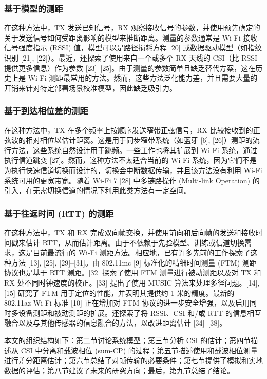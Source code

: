\documentclass[journal]{IEEEtran}
\begin{document}
\subsubsection{基于模型的测距}
在这种方法中，TX 发送已知信号，RX 观察接收信号的参数，并使用预先确定的关于发送信号如何受距离影响的模型来推断距离。测量的参数通常是 Wi-Fi 接收信号强度指示 (RSSI) 值，模型可以是路径损耗方程 [20] 或数据驱动模型（如指纹识别 [21], [22]）。最近，还探索了使用来自一个或多个 RX 天线的 CSI（比 RSSI 提供更多信息）作为参数 [23]–[25]。由于测量的参数简单且缺乏替代方案，这在历史上是 Wi-Fi 测距最常用的方法。然而，这些方法泛化能力差，并且需要大量的开销来针对特定部署场景校准模型，因此缺乏吸引力。

\subsubsection{基于到达相位差的测距}
在这种方法中，TX 在多个频率上按顺序发送窄带正弦信号，RX 比较接收到的正弦波的相对相位以估计距离。这是用于同步窄带系统（如蓝牙 [6], [26]）测距的流行方法，这些系统自然设计用于跳频。一些工作也将其扩展到 Wi-Fi 系统，通过执行信道跳变 [27]。然而，这种方法不太适合当前的 Wi-Fi 系统，因为它们不是为执行快速信道切换而设计的，切换会中断数据传输，并且该方法没有利用 Wi-Fi 系统可用的更宽带宽。随着 Wi-Fi 7 [28] 中多链路操作 (Multi-link Operation) 的引入，在无需切换信道的情况下利用此类方法有一定空间。

\subsubsection{基于往返时间 (RTT) 的测距}
在这种方法中，TX 和 RX 完成双向帧交换，并使用前向和后向帧的发送和接收时间戳来估计 RTT，从而估计距离。由于不依赖于先验模型、训练或信道切换需求，这是目前最流行的 Wi-Fi 测距方法。相应地，已有许多先前的工作探索了这种方法 [13], [25], [29]–[31]。由 802.11mc [9] 标准化的精细时间测量 (FTM) 测距协议也是基于 RTT 测距。[32] 探索了使用 FTM 测量进行被动测距以及对 TX 和 RX 处不同时钟速度的校正。[33] 提出了使用 MUSIC 算法来处理多径问题。[14], [15] 研究了 FTM 用于定位的性能，并表明其提供约 1 米的精度。最新的 802.11az Wi-Fi 标准 [10] 正在增加对 FTM 协议的进一步安全增强，以及启用同时多设备测距和被动测距的扩展。还探索了将 RSSI、CSI 和/或 RTT 的信息相互融合以及与其他传感器的信息融合的方法，以改进距离估计 [34]–[38]。

本文的组织结构如下：第二节讨论系统模型；第三节分析 CSI 的估计；第四节描述从 CSI 中分离和载波相位 (sum-CP) 的过程；第五节描述使用和载波相位测量进行差分距离估计；第六节总结了对帧传输的必要条件；第七节提供了模拟和实地数据的评估；第八节建议了未来的研究方向；最后，第九节总结了结论。
\end{document}
